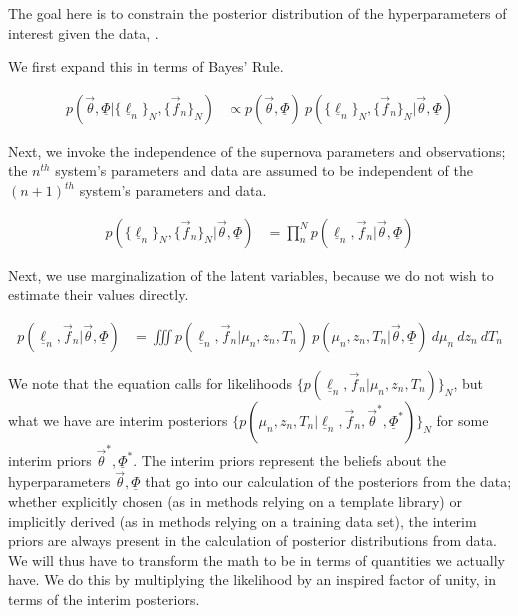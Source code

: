 \documentclass[12pt, onecolumn]{emulateapj}
\newcommand{\textul}{\underline}
\begin{document}
The goal here is to constrain the posterior distribution of the hyperparameters of interest given the data, .

We first expand this in terms of Bayes' Rule.

\begin{align}
p(\vec{\theta}, \textul{\Phi} | \{\textul{\ell}_{n}\}_{N}, \{\vec{f}_{n}\}_{N}) &\propto p(\vec{\theta}, \textul{\Phi})\ p(\{\textul{\ell}_{n}\}_{N}, \{\vec{f}_{n}\}_{N} | \vec{\theta}, \textul{\Phi})
\end{align}

Next, we invoke the independence of the supernova parameters and observations; the $n^{th}$ system's parameters and data are assumed to be independent of the $(n+1)^{th}$ system's parameters and data.

\begin{align}
p(\{\textul{\ell}_{n}\}_{N}, \{\vec{f}_{n}\}_{N} | \vec{\theta}, \textul{\Phi}) &= \prod_{n}^{N}p(\textul{\ell}_{n}, \vec{f}_{n} | \vec{\theta}, \textul{\Phi})
\end{align}

Next, we use marginalization of the latent variables, because we do not wish to estimate their values directly.

\begin{align}
p(\textul{\ell}_{n}, \vec{f}_{n} | \vec{\theta}, \textul{\Phi}) &= \iiint p(\textul{\ell}_{n}, \vec{f}_{n} | \mu_{n}, z_{n}, T_{n})\ p(\mu_{n}, z_{n}, T_{n} | \vec{\theta}, \textul{\Phi})\ d\mu_{n}\ dz_{n}\ dT_{n}
\end{align}

We note that the equation calls for likelihoods $\{p(\textul{\ell}_{n}, \vec{f}_{n} | \mu_{n}, z_{n}, T_{n})\}_{N}$, but what we have are interim posteriors $\{p(\mu_{n}, z_{n}, T_{n} | \textul{\ell}_{n}, \vec{f}_{n}, \vec{\theta}^{*}, \textul{\Phi}^{*})\}_{N}$ for some interim priors $\vec{\theta}^{*}, \textul{\Phi}^{*}$.  The interim priors represent the beliefs about the hyperparameters $\vec{\theta}, \textul{\Phi}$ that go into our calculation of the posteriors from the data; whether explicitly chosen (as in methods relying on a template library) or implicitly derived (as in methods relying on a training data set), the interim priors are always present in the calculation of posterior distributions from data.  We will thus have to transform the math to be in terms of quantities we actually have.  We do this by multiplying the likelihood by an inspired factor of unity, in terms of the interim posteriors.
\end{document}
